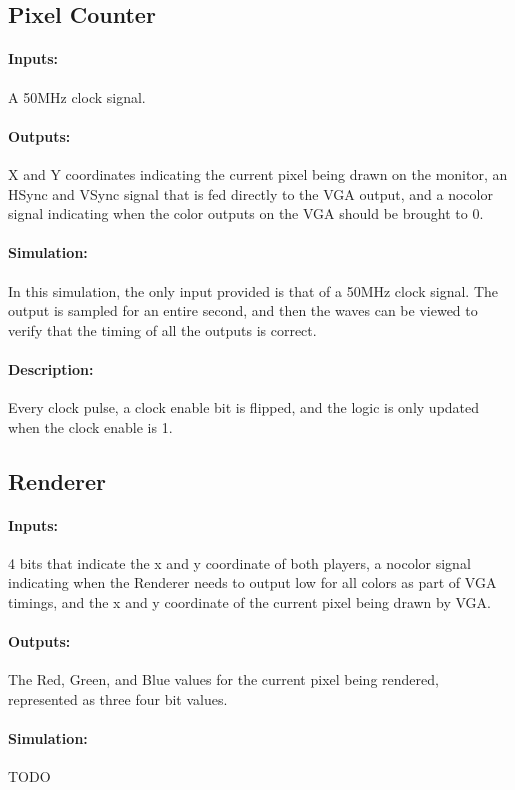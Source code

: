 \documentclass[]{article}
\begin{document}
\subsection{Pixel Counter}
\paragraph{Inputs:} A 50MHz clock signal.
\paragraph{Outputs:} X and Y coordinates indicating the current pixel being drawn on the monitor, an HSync and VSync signal that is fed directly to the VGA output, and a nocolor signal indicating when the color outputs on the VGA should be brought to 0.
\paragraph{Simulation:} In this simulation, the only input provided is that of a 50MHz clock signal.  The output is sampled for an entire second, and then the waves can be viewed to verify that the timing of all the outputs is correct.
\paragraph{Description:} Every clock pulse, a clock enable bit is flipped, and the logic is only updated when the clock enable is 1.

\subsection{Renderer}
\paragraph{Inputs:} 4 bits that indicate the x and y coordinate of both players, a nocolor signal indicating when the Renderer needs to output low for all colors as part of VGA timings, and the x and y coordinate of the current pixel being drawn by VGA.
\paragraph{Outputs:} The Red, Green, and Blue values for the current pixel being rendered, represented as three four bit values. 
\paragraph{Simulation:} TODO
\end{document}
